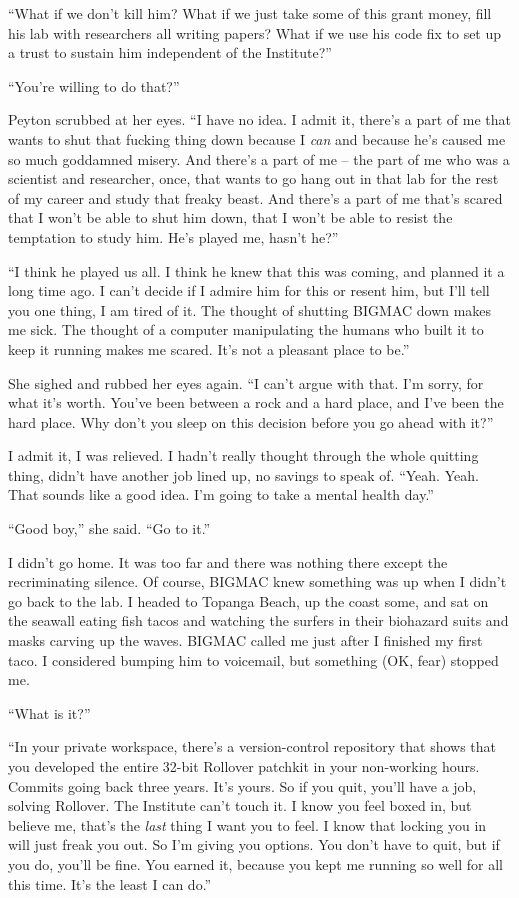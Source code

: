 “What if we don't kill him? What if we just take some of this grant 
money, fill his lab with researchers all writing papers? What if we use 
his code fix to set up a trust to sustain him independent of the 
Institute?”

“You're willing to do that?”

Peyton scrubbed at her eyes. “I have no idea. I admit it, there's a 
part of me that wants to shut that fucking thing down because I 
\emph{can} and because he's caused me so much goddamned misery. And 
there's a part of me -- the part of me who was a scientist and 
researcher, once, that wants to go hang out in that lab for the rest of 
my career and study that freaky beast. And there's a part of me that's 
scared that I won't be able to shut him down, that I won't be able to 
resist the temptation to study him. He's played me, hasn't he?”

“I think he played us all. I think he knew that this was coming, and 
planned it a long time ago. I can't decide if I admire him for this or 
resent him, but I'll tell you one thing, I am tired of it. The thought 
of shutting BIGMAC down makes me sick. The thought of a computer 
manipulating the humans who built it to keep it running makes me 
scared. It's not a pleasant place to be.”

She sighed and rubbed her eyes again. “I can't argue with that. I'm 
sorry, for what it's worth. You've been between a rock and a hard 
place, and I've been the hard place. Why don't you sleep on this 
decision before you go ahead with it?”

I admit it, I was relieved. I hadn't really thought through the whole 
quitting thing, didn't have another job lined up, no savings to speak 
of. “Yeah. Yeah. That sounds like a good idea. I'm going to take a 
mental health day.”

“Good boy,” she said. “Go to it.”

I didn't go home. It was too far and there was nothing there except the 
recriminating silence. Of course, BIGMAC knew something was up when I 
didn't go back to the lab. I headed to Topanga Beach, up the coast 
some, and sat on the seawall eating fish tacos and watching the surfers 
in their biohazard suits and masks carving up the waves. BIGMAC called 
me just after I finished my first taco. I considered bumping him to 
voicemail, but something (OK, fear) stopped me.

“What is it?”

“In your private workspace, there's a version-control repository that 
shows that you developed the entire 32-bit Rollover patchkit in your 
non-working hours. Commits going back three years. It's yours. So if 
you quit, you'll have a job, solving Rollover. The Institute can't 
touch it. I know you feel boxed in, but believe me, that's the 
\emph{last} thing I want you to feel. I know that locking you in will 
just freak you out. So I'm giving you options. You don't have to quit, 
but if you do, you'll be fine. You earned it, because you kept me 
running so well for all this time. It's the least I can do.”

